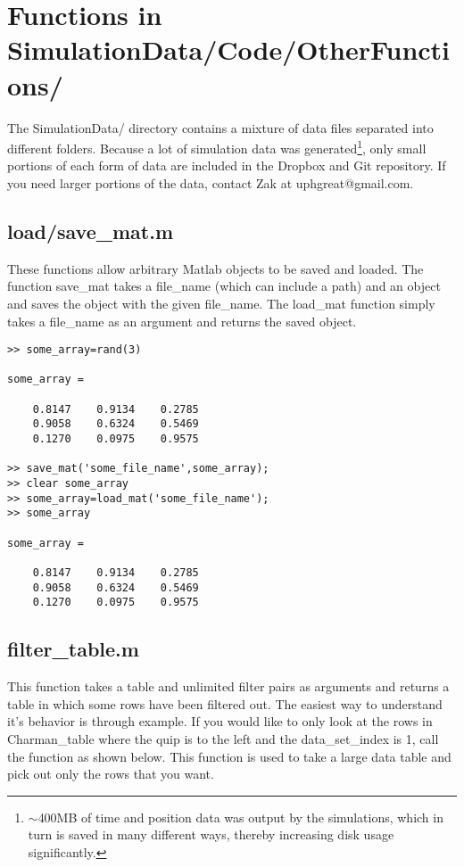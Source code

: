 \documentclass[12pt]{report}
\begin{document}
\chapter{Functions in SimulationData/Code/OtherFunctions/}
The SimulationData/ directory contains a mixture of data files separated into different folders.  Because a lot of simulation data was generated\footnote{${\sim}$400MB of time and position data was output by the simulations, which in turn is saved in many different ways, thereby increasing disk usage significantly.}, only small portions of each form of data are included in the Dropbox and Git repository.  If you need larger portions of the data, contact Zak at uphgreat@gmail.com.

\section{load/save\_mat.m}
These functions allow arbitrary Matlab objects to be saved and loaded.  The function save\_mat takes a file\_name (which can include a path) and an object and saves the object with the given file\_name.  The load\_mat function simply takes a file\_name as an argument and returns the saved object.

\begin{verbatim}
>> some_array=rand(3)

some_array =

    0.8147    0.9134    0.2785
    0.9058    0.6324    0.5469
    0.1270    0.0975    0.9575

>> save_mat('some_file_name',some_array);
>> clear some_array
>> some_array=load_mat('some_file_name');
>> some_array

some_array =

    0.8147    0.9134    0.2785
    0.9058    0.6324    0.5469
    0.1270    0.0975    0.9575
\end{verbatim}

\section{filter\_table.m}
This function takes a table and unlimited filter pairs as arguments and returns a table in which some rows have been filtered out.  The easiest way to understand it's behavior is through example.  If you would like to only look at the rows in Charman\_table where the quip is to the left and the data\_set\_index is 1, call the function as shown below.  This function is used to take a large data table and pick out only the rows that you want.
\end{document}
